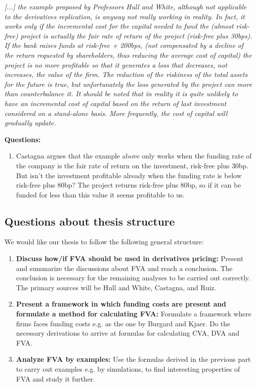 \documentclass[10pt,a4paper]{article}
\begin{document}
        \textit{[...] the example proposed by Professors Hull and White, although not applicable to the derivatives replication, is anyway not really working in reality. In fact, it works only if the incremental cost for the capital needed to fund the (almost risk-free) project is actually the fair rate of return of the project (risk-free plus 30bps). If the bank raises funds at risk-free + 200bps, (not compensated by a decline of the return requested by shareholders, thus reducing the average cost of capital) the project is no more profitable so that it generates a loss that decreases, not increases, the value of the firm. The reduction of the riskiness of the total assets for the future is true, but unfortunately the loss generated by the project can more than counterbalance it. It should be noted that in reality it is quite unlikely to have an incremental cost of capital based on the return of last investment considered on a stand-alone basis. More frequently, the cost of capital will gradually update.}

        \textbf{Questions:}
        \begin{enumerate}
            \item Castagna argues that the example above only works when the funding rate of the company is the fair rate of return on the investment, risk-free plus 30bp. But isn't the investment profitable already when the funding rate is below risk-free plus 80bp? The project returns risk-free plus 80bp, so if it can be funded for less than this value it seems profitable to us.
        \end{enumerate}
    
    \subsection{Questions about thesis structure}
        We would like our thesis to follow the following general structure:
        \begin{enumerate}
            \item \textbf{Discuss how/if FVA should be used in derivatives pricing:} Present and summarize the discussions about FVA and reach a conclusion. The conclusion is necessary for the remaining analyses to be carried out correctly. The primary sources will be Hull and White, Castagna, and Ruiz.
            \item \textbf{Present a framework in which funding costs are present and formulate a method for calculating FVA:} Formulate a framework where firms faces funding costs e.g. as the one by Burgard and Kjaer. Do the necessary derivations to arrive at formulas for calculating CVA, DVA and FVA. 
            \item \textbf{Analyze FVA by examples:} Use the formulas derived in the previous part to carry out examples e.g. by simulations, to find interesting properties of FVA and study it further.
        \end{enumerate}
\end{document}
